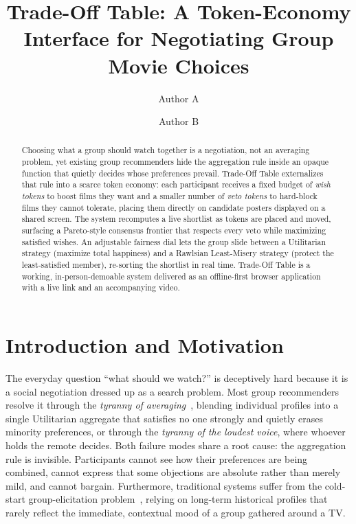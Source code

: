 \documentclass[sigconf]{acmart}
\title{Trade-Off Table: A Token-Economy Interface for Negotiating Group Movie Choices}
\author{Author A}
\affiliation{%
  \institution{Institution}
  \city{City}
  \country{Country}
}
\author{Author B}
\affiliation{%
  \institution{Institution}
  \city{City}
  \country{Country}
}
\begin{document}
\begin{abstract}
Choosing what a group should watch together is a negotiation, not an averaging problem, yet existing group recommenders hide the aggregation rule inside an opaque function that quietly decides whose preferences prevail. Trade-Off Table externalizes that rule into a scarce token economy: each participant receives a fixed budget of \emph{wish tokens} to boost films they want and a smaller number of \emph{veto tokens} to hard-block films they cannot tolerate, placing them directly on candidate posters displayed on a shared screen. The system recomputes a live shortlist as tokens are placed and moved, surfacing a Pareto-style consensus frontier that respects every veto while maximizing satisfied wishes. An adjustable fairness dial lets the group slide between a Utilitarian strategy (maximize total happiness) and a Rawlsian Least-Misery strategy (protect the least-satisfied member), re-sorting the shortlist in real time. Trade-Off Table is a working, in-person-demoable system delivered as an offline-first browser application with a live link and an accompanying video.
\end{abstract}

\maketitle

\section{Introduction and Motivation}
The everyday question ``what should we watch?'' is deceptively hard because it is a social negotiation dressed up as a search problem. Most group recommenders resolve it through the \emph{tyranny of averaging}~\cite{masthoff2011group}, blending individual profiles into a single Utilitarian aggregate that satisfies no one strongly and quietly erases minority preferences, or through the \emph{tyranny of the loudest voice}, where whoever holds the remote decides. Both failure modes share a root cause: the aggregation rule is invisible. Participants cannot see how their preferences are being combined, cannot express that some objections are absolute rather than merely mild, and cannot bargain. Furthermore, traditional systems suffer from the cold-start group-elicitation problem~\cite{jameson2007recommendation}, relying on long-term historical profiles that rarely reflect the immediate, contextual mood of a group gathered around a TV.
\end{document}
